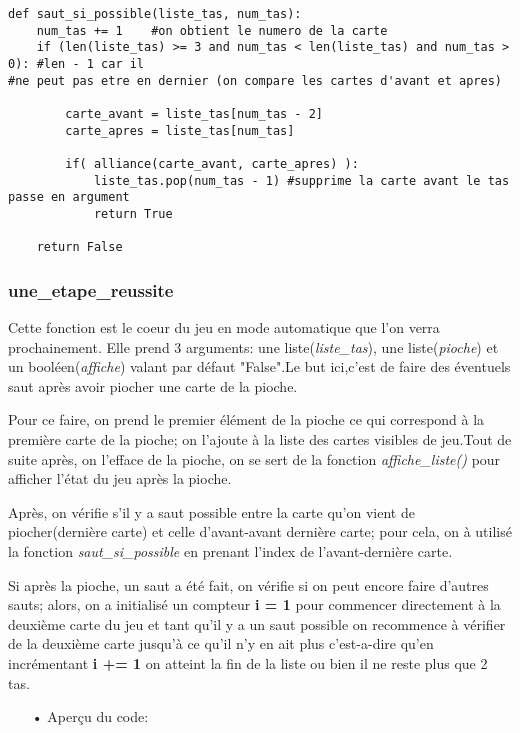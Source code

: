 	\lstset{language=Python}
	\lstset{frame=lines}
	\lstset{basicstyle=\footnotesize}
	\begin{lstlisting}	
def saut_si_possible(liste_tas, num_tas):
	num_tas += 1	#on obtient le numero de la carte
    if (len(liste_tas) >= 3 and num_tas < len(liste_tas) and num_tas > 0): #len - 1 car il 
#ne peut pas etre en dernier (on compare les cartes d'avant et apres)

        carte_avant = liste_tas[num_tas - 2]
        carte_apres = liste_tas[num_tas]

        if( alliance(carte_avant, carte_apres) ):
            liste_tas.pop(num_tas - 1) #supprime la carte avant le tas passe en argument
            return True

    return False
	\end{lstlisting}
	
	\subsubsection{une\_etape\_reussite}
	Cette fonction est le coeur du jeu en mode automatique que l'on verra prochainement. Elle prend 3 arguments: une liste(\emph{liste\_tas}), une liste(\emph{pioche}) et un booléen(\emph{affiche}) valant par défaut "False".Le but ici,c'est de faire des éventuels saut après avoir piocher une carte de la pioche.
	\par Pour ce faire, on prend le premier élément de la pioche ce qui correspond à la première carte de la pioche; on l'ajoute à la liste des cartes visibles de jeu.Tout de suite après, on l'efface de la pioche, on se sert de la fonction \emph{affiche\_liste()} pour afficher l'état du jeu après la pioche.
	\par Après,  on vérifie s'il y a saut possible entre la carte qu'on vient de piocher(dernière carte) et celle d'avant-avant dernière carte; pour cela, on à utilisé la fonction \emph{saut\_si\_possible} en prenant l'index de l'avant-dernière carte. 
	\par Si après la pioche, un saut a été fait, on vérifie si on peut encore faire d'autres sauts; alors, on a initialisé un compteur \textbf{i = 1} pour commencer directement à la deuxième carte du jeu et tant qu'il y a un saut possible on recommence à vérifier de la deuxième carte jusqu'à ce qu'il n'y en ait plus c'est-a-dire qu'en incrémentant \textbf{i += 1} on atteint la fin de la liste ou bien il ne reste plus que 2 tas.
	\\
	\begin{itemize}
	\color{blue}\item[•]Aperçu du code:
	\end{itemize}
	
